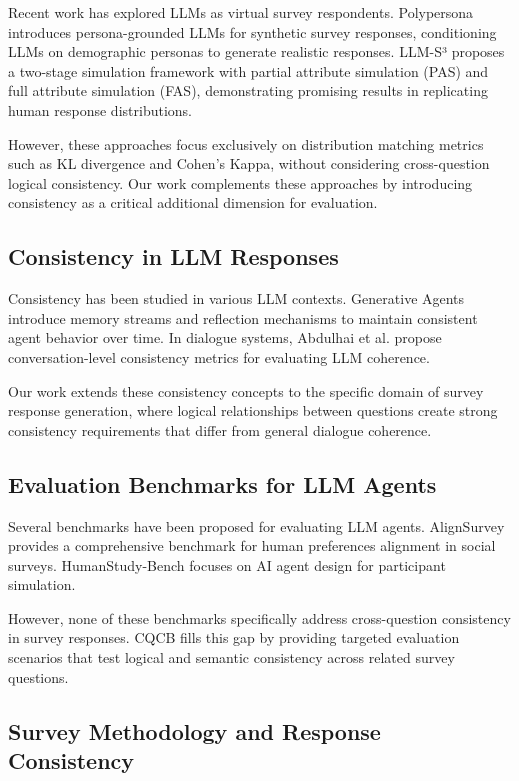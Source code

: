 \documentclass[sigconf, anonymous]{acmart}
\begin{document}
Recent work has explored LLMs as virtual survey respondents. Polypersona \cite{chen2025polypersona} introduces persona-grounded LLMs for synthetic survey responses, conditioning LLMs on demographic personas to generate realistic responses. LLM-S³ \cite{wang2025large} proposes a two-stage simulation framework with partial attribute simulation (PAS) and full attribute simulation (FAS), demonstrating promising results in replicating human response distributions.

However, these approaches focus exclusively on distribution matching metrics such as KL divergence and Cohen's Kappa, without considering cross-question logical consistency. Our work complements these approaches by introducing consistency as a critical additional dimension for evaluation.

\subsection{Consistency in LLM Responses}

Consistency has been studied in various LLM contexts. Generative Agents \cite{park2023generative} introduce memory streams and reflection mechanisms to maintain consistent agent behavior over time. In dialogue systems, Abdulhai et al. \cite{abdulhai2025measuring} propose conversation-level consistency metrics for evaluating LLM coherence.

Our work extends these consistency concepts to the specific domain of survey response generation, where logical relationships between questions create strong consistency requirements that differ from general dialogue coherence.

\subsection{Evaluation Benchmarks for LLM Agents}

Several benchmarks have been proposed for evaluating LLM agents. AlignSurvey \cite{liu2025alignsurvey} provides a comprehensive benchmark for human preferences alignment in social surveys. HumanStudy-Bench \cite{zhang2026humanstudy} focuses on AI agent design for participant simulation.

However, none of these benchmarks specifically address cross-question consistency in survey responses. CQCB fills this gap by providing targeted evaluation scenarios that test logical and semantic consistency across related survey questions.

\subsection{Survey Methodology and Response Consistency}
\end{document}
